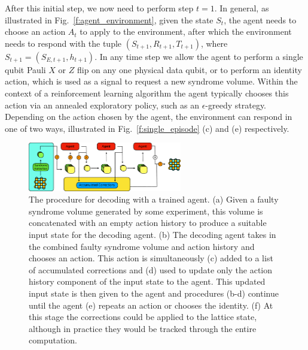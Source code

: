 \documentclass[twocolumn,preprintnumbers,amsmath,amssymb,notitlepage,nofootinbib,longbibliography,superscriptaddress,aps,pra,10pt]{revtex4-1}
\begin{document}
    After this initial step, we now need to perform step $t=1$.
    In general, as illustrated in Fig.~\ref{f:agent_environment}, given the state $S_t$, the agent needs to choose an action $A_t$ to apply to the environment, after which the environment needs to respond with the tuple $(S_{t+1}, R_{t+1}, T_{t+1})$, where $S_{t+1}=(S_{E,{t+1}},h_{t+1})$.
    In any time step we allow the agent to perform a single qubit Pauli $X$ or $Z$ flip on any one physical data qubit, or to perform an identity action, which is used as a signal to request a new syndrome volume.
    Within the context of a reinforcement learning algorithm the agent typically chooses this action via an annealed exploratory policy, such as an $\epsilon$-greedy strategy.
    Depending on the action chosen by the agent, the environment can respond in one of two ways, illustrated in Fig.~\ref{f:single_episode} (c) and (e) respectively.

	\begin{figure}
		\centering
		\includegraphics[width=0.6\textwidth]{figures/agent_decoding.pdf}
		\caption{
			The procedure for decoding with a trained agent.
			(a) Given a faulty syndrome volume generated by some experiment, this volume is concatenated with an empty action history to produce a suitable input state for the decoding agent.
			(b) The decoding agent takes in the combined faulty syndrome volume and action history and chooses an action.
			This action is simultaneously (c) added to a list of accumulated corrections and (d) used to update only the action history component of the input state to the agent.
			This updated input state is then given to the agent and procedures (b-d) continue until the agent (e) repeats an action or chooses the identity.
			(f) At this stage the corrections could be applied to the lattice state, although in practice they would be tracked through the entire computation.
		}
		\label{agent_decoding}
	\end{figure}
\end{document}
